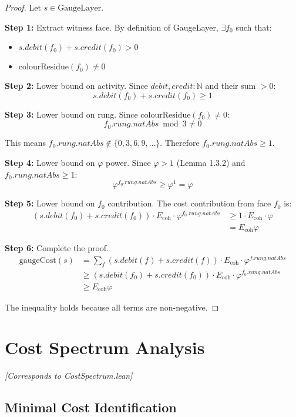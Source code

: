 \documentclass[11pt]{article}
\numberwithin{equation}{section}
\theoremstyle{remark}
\newcommand{\Ecoh}{E_{\text{coh}}}
\newcommand{\N}{\mathbb{N}}
\begin{document}
\begin{proof}
Let $s \in \text{GaugeLayer}$.

\textbf{Step 1:} Extract witness face.
By definition of GaugeLayer, $\exists f_0$ such that:
\begin{itemize}
\item $s.debit(f_0) + s.credit(f_0) > 0$
\item $\text{colourResidue}(f_0) \neq 0$
\end{itemize}

\textbf{Step 2:} Lower bound on activity.
Since $debit, credit : \N$ and their sum $> 0$:
\[s.debit(f_0) + s.credit(f_0) \geq 1\]

\textbf{Step 3:} Lower bound on rung.
Since $\text{colourResidue}(f_0) \neq 0$:
\[f_0.rung.natAbs \bmod 3 \neq 0\]

This means $f_0.rung.natAbs \notin \{0, 3, 6, 9, \ldots\}$.
Therefore $f_0.rung.natAbs \geq 1$.

\textbf{Step 4:} Lower bound on $\varphi$ power.
Since $\varphi > 1$ (Lemma 1.3.2) and $f_0.rung.natAbs \geq 1$:
\[\varphi^{f_0.rung.natAbs} \geq \varphi^1 = \varphi\]

\textbf{Step 5:} Lower bound on $f_0$ contribution.
The cost contribution from face $f_0$ is:
\begin{align}
(s.debit(f_0) + s.credit(f_0)) \cdot \Ecoh \cdot \varphi^{f_0.rung.natAbs} 
&\geq 1 \cdot \Ecoh \cdot \varphi\\
&= \Ecoh \varphi
\end{align}

\textbf{Step 6:} Complete the proof.
\begin{align}
\text{gaugeCost}(s) &= \sum_f (s.debit(f) + s.credit(f)) \cdot \Ecoh \cdot \varphi^{f.rung.natAbs}\\
&\geq (s.debit(f_0) + s.credit(f_0)) \cdot \Ecoh \cdot \varphi^{f_0.rung.natAbs}\\
&\geq \Ecoh \varphi
\end{align}

The inequality holds because all terms are non-negative.
\end{proof}

\section{Cost Spectrum Analysis}
\textit{[Corresponds to CostSpectrum.lean]}

\subsection{Minimal Cost Identification}
\end{document}
